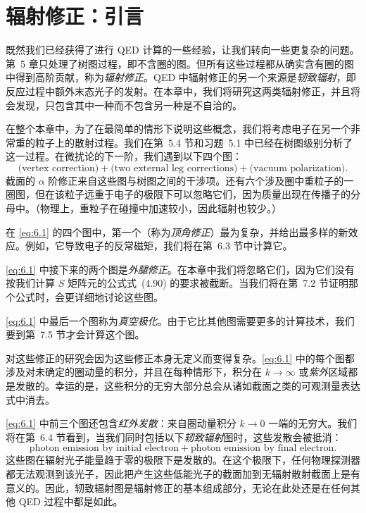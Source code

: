 \chapter{辐射修正：引言}

既然我们已经获得了进行 QED 计算的一些经验，让我们转向一些更复杂的问题。第~5 章只处理了树图过程，即不含圈的图。但所有这些过程都从确实含有圈的图中得到高阶贡献，称为\emph{辐射修正}。QED 中辐射修正的另一个来源是\emph{轫致辐射}，即反应过程中额外末态光子的发射。在本章中，我们将研究这两类辐射修正，并且将会发现，只包含其中一种而不包含另一种是不自洽的。

在整个本章中，为了在最简单的情形下说明这些概念，我们将考虑电子在另一个非常重的粒子上的散射过程。我们在第~5.4 节和习题~5.1 中已经在树图级别分析了这一过程。在微扰论的下一阶，我们遇到以下四个图：
\begin{equation}
  \text{(vertex correction)} + \text{(two external leg corrections)}
    + \text{(vacuum polarization)} .
  \label{eq:6.1}
\end{equation}
截面的 $\alpha$ 阶修正来自这些图与树图之间的干涉项。还有六个涉及圈中重粒子的一圈图，但在该粒子远重于电子的极限下可以忽略它们，因为质量出现在传播子的分母中。（物理上，重粒子在碰撞中加速较小，因此辐射也较少。）

在 \eqref{eq:6.1} 的四个图中，第一个（称为\emph{顶角修正}）最为复杂，并给出最多样的新效应。例如，它导致电子的反常磁矩，我们将在第~6.3 节中计算它。

\eqref{eq:6.1} 中接下来的两个图是\emph{外腿修正}。在本章中我们将忽略它们，因为它们没有按我们计算 $S$ 矩阵元的公式式~(4.90) 的要求被截断。当我们将在第~7.2 节证明那个公式时，会更详细地讨论这些图。

\eqref{eq:6.1} 中最后一个图称为\emph{真空极化}。由于它比其他图需要更多的计算技术，我们要到第~7.5 节才会计算这个图。

对这些修正的研究会因为这些修正本身无定义而变得复杂。\eqref{eq:6.1} 中的每个图都涉及对未确定的圈动量的积分，并且在每种情形下，积分在 $k\to\infty$ 或\emph{紫外}区域都是发散的。幸运的是，这些积分的无穷大部分总会从诸如截面之类的可观测量表达式中消去。

\eqref{eq:6.1} 中前三个图还包含\emph{红外发散}：来自圈动量积分 $k\to 0$ 一端的无穷大。我们将在第~6.4 节看到，当我们同时包括以下\emph{轫致辐射}图时，这些发散会被抵消：
\begin{equation}
  \text{photon emission by initial electron} + \text{photon emission by
    final electron} .
  \label{eq:6.2}
\end{equation}
这些图在辐射光子能量趋于零的极限下是发散的。在这个极限下，任何物理探测器都无法观测到该光子，因此把产生这些低能光子的截面加到无辐射散射截面上是有意义的。因此，轫致辐射图是辐射修正的基本组成部分，无论在此处还是在任何其他 QED 过程中都是如此。

